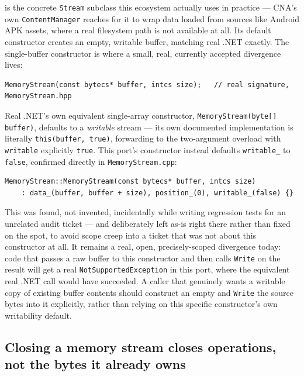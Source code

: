  is the concrete \texttt{Stream} subclass this ecosystem
actually uses in practice --- CNA's own \texttt{ContentManager} reaches for it to wrap data
loaded from sources like Android APK assets, where a real filesystem path is not available at
all. Its default constructor creates an empty, writable buffer, matching real .NET exactly. The
single-buffer constructor is where a small, real, currently accepted divergence lives:

\begin{lstlisting}
MemoryStream(const bytecs* buffer, intcs size);   // real signature, MemoryStream.hpp
\end{lstlisting}

Real .NET's own equivalent single-array constructor, \texttt{MemoryStream(byte[] buffer)},
defaults to a \emph{writable} stream --- its own documented implementation is literally
\texttt{this(buffer, true)}, forwarding to the two-argument overload with \texttt{writable}
explicitly \texttt{true}. This port's constructor instead defaults \texttt{writable\_} to
\texttt{false}, confirmed directly in \texttt{MemoryStream.cpp}:

\begin{lstlisting}
MemoryStream::MemoryStream(const bytecs* buffer, intcs size)
    : data_(buffer, buffer + size), position_(0), writable_(false) {}
\end{lstlisting}

This was found, not invented, incidentally while writing regression tests for an unrelated
audit ticket --- and deliberately left as-is right there rather than fixed on the spot, to
avoid scope creep into a ticket that was not about this constructor at all. It remains a
real, open, precisely-scoped divergence today: code that passes a raw buffer to this
constructor and then calls \texttt{Write} on the result will get a real
\texttt{NotSupportedException} in this port, where the equivalent real .NET call would have
succeeded. A caller that genuinely wants a writable copy of existing buffer contents should
construct an empty  and \texttt{Write} the source bytes into it
explicitly, rather than relying on this specific constructor's own writability default.

\subsection{Closing a memory stream closes operations, not the bytes it already owns}

